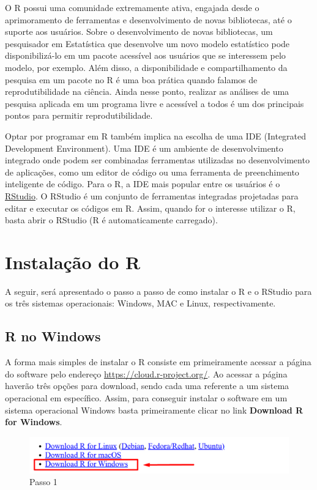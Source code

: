 \documentclass[
  letterpaper,
  DIV=11,
  numbers=noendperiod]{scrreprt}
\begin{document}
O R possui uma comunidade extremamente ativa, engajada desde o
aprimoramento de ferramentas e desenvolvimento de novas bibliotecas, até
o suporte aos usuários. Sobre o desenvolvimento de novas bibliotecas, um
pesquisador em Estatística que desenvolve um novo modelo estatístico
pode disponibilizá-lo em um pacote acessível aos usuários que se
interessem pelo modelo, por exemplo. Além disso, a disponibilidade e
compartilhamento da pesquisa em um pacote no R é uma boa prática quando
falamos de reprodutibilidade na ciência. Ainda nesse ponto, realizar as
análises de uma pesquisa aplicada em um programa livre e acessível a
todos é um dos principais pontos para permitir reprodutibilidade.

Optar por programar em R também implica na escolha de uma IDE
(Integrated Development Environment). Uma IDE é um ambiente de
desenvolvimento integrado onde podem ser combinadas ferramentas
utilizadas no desenvolvimento de aplicações, como um editor de código ou
uma ferramenta de preenchimento inteligente de código. Para o R, a IDE
mais popular entre os usuários é o \href{https://rstudio.com}{RStudio}.
O RStudio é um conjunto de ferramentas integradas projetadas para editar
e executar os códigos em R. Assim, quando for o interesse utilizar o R,
basta abrir o RStudio (R é automaticamente carregado).

\hypertarget{instalauxe7uxe3o-do-r}{%
\section{Instalação do R}\label{instalauxe7uxe3o-do-r}}

A seguir, será apresentado o passo a passo de como instalar o R e o
RStudio para os três sistemas operacionais: Windows, MAC e Linux,
respectivamente.

\hypertarget{r-no-windows}{%
\subsection{R no Windows}\label{r-no-windows}}

A forma mais simples de instalar o R consiste em primeiramente acessar a
página do software pelo endereço \url{https://cloud.r-project.org/}. Ao
acessar a página haverão três opções para download, sendo cada uma
referente a um sistema operacional em específico. Assim, para conseguir
instalar o software em um sistema operacional Windows basta
primeiramente clicar no link \textbf{Download R for Windows}.

\begin{figure}

{\centering \includegraphics[width=1\textwidth,height=\textheight]{./figuras_tutorialR/install_Windows0.png}

}

\caption{Passo 1}

\end{figure}
\end{document}
